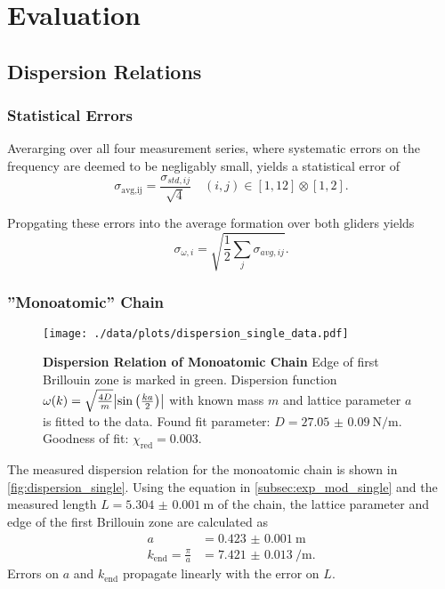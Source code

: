 \chapter{Evaluation}

\section{Dispersion Relations}\label{sec:disp_rels}
\subsection{Statistical Errors}
Averarging over all four measurement series, where systematic errors on the frequency are deemed to be negligably small, yields a statistical error of
\begin{equation*}
	\sigma_\text{avg,ij} = \frac{\sigma_{std,ij}}{\sqrt{4}}\quad (i,j)\in[1, 12]\otimes[1,2].
\end{equation*}

Propgating these errors into the average formation over both gliders yields
\begin{equation*}
	\sigma_{\omega,i} = \sqrt{\frac{1}{2}\sum_{j}\sigma_{avg,ij}}.
\end{equation*}

\subsection{''Monoatomic'' Chain}\label{subsec:disp_mono}
\begin{figure}
	\centering
	\texttt{[image: ./data/plots/dispersion\_single\_data.pdf]}
	\caption[Dispersion Relation of Monoatomic Chain]{\textbf{Dispersion Relation of Monoatomic Chain} Edge of first Brillouin zone is marked in green.
	Dispersion function $\omega(k) = \sqrt{\frac{4D}{m}}\abs{\sin\left(\frac{ka}{2}\right)}$ with known mass $m$ and lattice parameter $a$ is fitted to the data.
	Found fit parameter: $D=\SI{27.05(9)}{\newton\per\meter}$. Goodness of fit: $\chi_\text{red}=\num{0.003}$.}
	\label{fig:dispersion_single}
\end{figure}
The measured dispersion relation for the monoatomic chain is shown in \autoref{fig:dispersion_single}.
Using the equation in \autoref{subsec:exp_mod_single} and the measured length $L=\SI{5.304(1)}{\meter}$ of the chain, the lattice parameter and edge of the first Brillouin zone are calculated as
\begin{align*}
	a &= \SI{0.423(1)}{\meter} \\
	k_\text{end} = \frac{\pi}{a} &= \SI{7.421(13)}{\per\meter}.
\end{align*}
Errors on $a$ and $k_\text{end}$ propagate linearly with the error on $L$.

